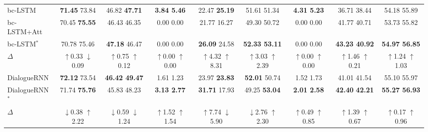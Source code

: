 {{\begin{table*}[!t]
{\begin{tabular}{l|cccccccc}
			bc-LSTM    \cite{poria2017context}              & \textbf{71.45}   73.84 & 46.82   \textbf{47.71} & \textbf{3.84  5.46} & 22.47  \textbf{25.19} & 51.61  {51.34} & \textbf{4.31  5.23} & 36.71  38.44 & 54.18  55.89 \\
			bc-LSTM+Att & 70.45 {\textbf{75.55}} & 46.43 46.35 & 0.00 0.00 &21.77 16.27 & 49.30 50.72 & 0.00 0.00 & 41.77 40.71 & 53.73 55.82 \\
			\rowcolor{gray!30}
			bc-LSTM$^\ast$ & 70.78 {75.46} & \textbf{47.18} 46.47 & 0.00 0.00 & \textbf{26.09} 24.58 & \textbf{52.33 53.11} & 0.00 0.00 & \textbf{43.23 40.92} & \textbf{54.97 56.85}\\ 
			$\Delta$ & \textcolor[rgb]{0.0,0.6,0.0}{$\uparrow$0.33} \textcolor[rgb]{0.2,0.2,0.2}{$\downarrow$0.09} & \textcolor[rgb]{0.0,0.6,0.0}{$\uparrow$0.75} \textcolor[rgb]{0.0,0.6,0.0}{$\uparrow$0.12} & \textcolor[rgb]{0.0,0.6,0.0}{$\uparrow$0.00} \textcolor[rgb]{0.0,0.6,0.0}{$\uparrow$0.00} &  \textcolor[rgb]{0.0,0.6,0.0}{$\uparrow$4.32} \textcolor[rgb]{0.0,0.6,0.0}{$\uparrow$8.31} & \textcolor[rgb]{0.0,0.6,0.0}{$\uparrow$3.03} \textcolor[rgb]{0.0,0.6,0.0}{$\uparrow$2.39} & \textcolor[rgb]{0.0,0.6,0.0}{$\uparrow$0.00} \textcolor[rgb]{0.0,0.6,0.0}{$\uparrow$0.00} & \textcolor[rgb]{0.0,0.6,0.0}{$\uparrow$1.46} \textcolor[rgb]{0.0,0.6,0.0}{$\uparrow$0.21} & \textcolor[rgb]{0.0,0.6,0.0}{$\uparrow$1.24} \textcolor[rgb]{0.0,0.6,0.0}{$\uparrow$1.03}  \\ \hline
			
			DialogueRNN  \cite{majumder2019dialoguernn}            & \textbf{72.12}   73.54 & \textbf{46.42  49.47}  & {1.61  1.23} & 23.97  \textbf{23.83} & \textbf{52.01}  50.74 & {1.52  1.73} & 41.01  {41.54} & 55.10  55.97 \\
			\rowcolor{gray!30}
			DialogueRNN$^\ast$ & 71.74 \textbf{75.76} & 45.83 48.23 & \textbf{3.13 2.77} & \textbf{31.71} 17.93 & 49.25 \textbf{53.04} & \textbf{2.01 2.58} & \textbf{42.40} {\textbf{42.21}} & \textbf{55.27 56.93}\\ 
			$\Delta$ & \textcolor[rgb]{0.2,0.2,0.2}{$\downarrow$0.38} \textcolor[rgb]{0.0,0.6,0.0}{$\uparrow$2.22} &  \textcolor[rgb]{0.2,0.2,0.2}{$\downarrow$0.59} \textcolor[rgb]{0.2,0.2,0.2}{$\downarrow$1.24} & \textcolor[rgb]{0.0,0.6,0.0}{$\uparrow$1.52} \textcolor[rgb]{0.0,0.6,0.0}{$\uparrow$1.54}  & \textcolor[rgb]{0.0,0.6,0.0}{$\uparrow$7.74} \textcolor[rgb]{0.2,0.2,0.2}{$\downarrow$5.90} & \textcolor[rgb]{0.2,0.2,0.2}{$\downarrow$2.76} \textcolor[rgb]{0.0,0.6,0.0}{$\uparrow$2.30} & \textcolor[rgb]{0.0,0.6,0.0}{$\uparrow$0.49} \textcolor[rgb]{0.0,0.6,0.0}{$\uparrow$0.85} & \textcolor[rgb]{0.0,0.6,0.0}{$\uparrow$1.39} \textcolor[rgb]{0.0,0.6,0.0}{$\uparrow$0.67} & \textcolor[rgb]{0.0,0.6,0.0}{$\uparrow$0.17} \textcolor[rgb]{0.0,0.6,0.0}{$\uparrow$0.96}  \\ \hline
			

\end{tabular}}
\end{table*}}}
